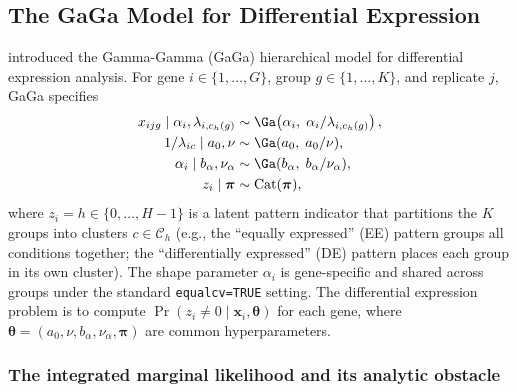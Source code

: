 
\subsection{The GaGa Model for Differential Expression}\label{sec:gaga}

\citet{Rossell2009GaGa} introduced the Gamma-Gamma (GaGa) hierarchical model
for differential expression analysis. For gene $i \in \{1,\dots,G\}$,
group $g \in \{1,\dots,K\}$, and replicate $j$, GaGa specifies
\begin{equation}\label{eq:gaga.model}
\begin{aligned}
x_{ijg} \mid \alpha_i, \lambda_{i,c_h(g)}
   &\sim \Ga\!\left(\alpha_i,\; \alpha_i / \lambda_{i,c_h(g)}\right),\\
1/\lambda_{ic} \mid a_0, \nu &\sim \Ga(a_0,\; a_0/\nu),\\
\alpha_i \mid b_\alpha, \nu_\alpha &\sim \Ga(b_\alpha,\; b_\alpha/\nu_\alpha),\\
z_i \mid \boldsymbol\pi &\sim \mathrm{Cat}(\boldsymbol\pi),
\end{aligned}
\end{equation}
where $z_i = h \in \{0,\dots,H-1\}$ is a latent pattern indicator that
partitions the $K$ groups into clusters $c \in \mathcal{C}_h$ (e.g., the
``equally expressed'' (EE) pattern groups all conditions together; the
``differentially expressed'' (DE) pattern places each group in its own
cluster). The shape parameter $\alpha_i$ is gene-specific and shared across
groups under the standard \texttt{equalcv=TRUE} setting. The differential
expression problem is to compute $\Pr(z_i \neq 0 \mid \mathbf{x}_i,
\boldsymbol\theta)$ for each gene, where $\boldsymbol\theta = (a_0, \nu,
b_\alpha, \nu_\alpha, \boldsymbol\pi)$ are common hyperparameters.

\subsubsection{The integrated marginal likelihood and its analytic obstacle}

